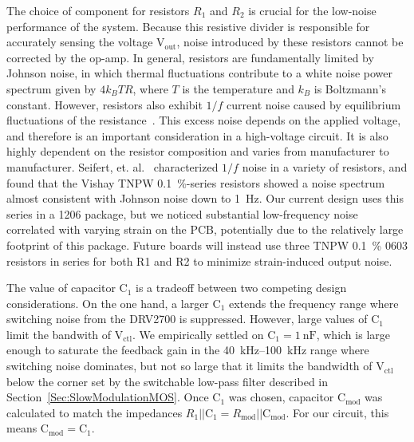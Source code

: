 \documentclass[aip,rsi,reprint]{revtex4-1} %
\begin{document}
The choice of component for resistors $R_1$ and $R_2$ is crucial for the low-noise performance of the system. 
Because this resistive divider is responsible for accurately sensing the voltage $\text{V}_\text{out}$, noise introduced by these resistors cannot be corrected by the op-amp.
In general, resistors are fundamentally limited by Johnson noise, in which thermal fluctuations contribute to a white noise power spectrum given by $4 k_B T R$, where $T$ is the temperature and $k_B$ is Boltzmann's constant\cite{Horowitz1989a}.
However, resistors also exhibit $1/f$ current noise caused by equilibrium fluctuations of the resistance~\cite{Clarke1974a,Voss1976a}.
This excess noise depends on the applied voltage, and therefore is an important consideration in a high-voltage circuit.
It is also highly dependent on the resistor composition and varies from manufacturer to manufacturer.
Seifert, et. al.~\cite{Seifert2009a} characterized $1/f$ noise in a variety of resistors, and found that the Vishay TNPW \SI{0.1}{\percent}-series resistors showed a noise spectrum almost consistent with Johnson noise down to \SI{1}{\hertz}.
Our current design uses this series in a 1206 package, but we noticed substantial low-frequency noise correlated with varying strain on the PCB, potentially due to the relatively large footprint of this package.
Future boards will instead use three TNPW \SI{0.1}{\percent} 0603 resistors in series for both R1 and R2 to minimize strain-induced output noise.

The value of capacitor $\text{C}_1$ is a tradeoff between two competing design considerations.
On the one hand, a larger $\text{C}_1$ extends the frequency range where switching noise from the DRV2700 is suppressed.
However, large values of $\text{C}_1$ limit the bandwith of $\text{V}_\text{ctl}$.
We empirically settled on $\text{C}_1 = \SI{1}{\nano\farad}$, which is large enough to saturate the feedback gain in the \SI{40}{\kilo\hertz}--\SI{100}{\kilo\hertz} range where switching noise dominates, but not so large that it limits the bandwidth of $\text{V}_\text{ctl}$ below the corner set by the switchable low-pass filter described in Section~\ref{Sec:SlowModulationMOS}.
Once $\text{C}_1$ was chosen, capacitor $\text{C}_\text{mod}$ was calculated to match the impedances $R_1||\text{C}_1=R_\text{mod}||\text{C}_\text{mod}$.
For our circuit, this means $\text{C}_\text{mod} = \text{C}_1$.
\end{document}
